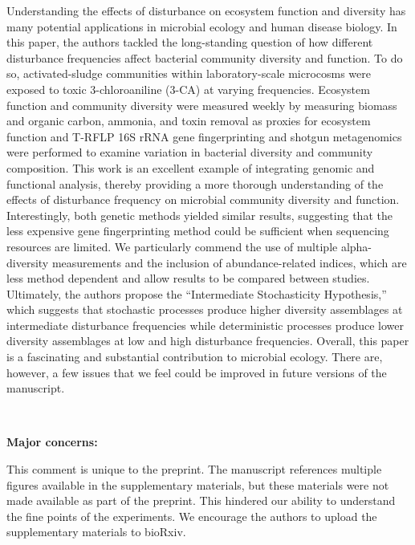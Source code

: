 \documentclass[10pt]{article}
\begin{document}
Understanding the effects of disturbance on ecosystem function and
diversity has many potential applications in microbial ecology and human
disease biology. In this paper, the authors tackled the long-standing
question of how different disturbance frequencies affect bacterial
community diversity and function. To do so, activated-sludge communities
within laboratory-scale microcosms were exposed to toxic 3-chloroaniline
(3-CA) at varying frequencies. Ecosystem function and community
diversity were measured weekly by measuring biomass and organic carbon,
ammonia, and toxin removal as proxies for ecosystem function and T-RFLP
16S rRNA gene fingerprinting and shotgun metagenomics were performed to
examine variation in bacterial diversity and community composition. This
work is an excellent example of integrating genomic and functional
analysis, thereby providing a more thorough understanding of the effects
of disturbance frequency on microbial community diversity and function.
Interestingly, both genetic methods yielded similar results, suggesting
that the less expensive gene fingerprinting method could be sufficient
when sequencing resources are limited. We particularly commend the use
of multiple alpha-diversity measurements and the inclusion of
abundance-related indices, which are less method dependent and allow
results to be compared between studies. Ultimately, the authors propose
the ``Intermediate Stochasticity Hypothesis,'' which suggests that
stochastic processes produce higher diversity assemblages at
intermediate disturbance frequencies while deterministic processes
produce lower diversity assemblages at low and high disturbance
frequencies. Overall, this paper is a fascinating and substantial
contribution to microbial ecology. There are, however, a few issues that
we feel could be improved in future versions of the manuscript.~

~

\textbf{Major concerns:}

\par\null

This comment is unique to the preprint. The manuscript references
multiple figures available in the supplementary materials, but these
materials were not made available as part of the preprint. This hindered
our ability to understand the fine points of the experiments. We
encourage the authors to upload the supplementary materials to bioRxiv.~

\par\null
\end{document}
